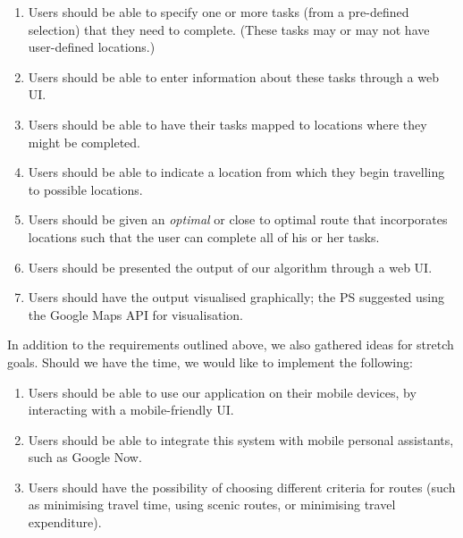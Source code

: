 \documentclass[10pt]{article}
\begin{document}
\begin{enumerate}
\item Users should be able to specify one or more tasks (from a pre-defined selection) that they need to complete. (These tasks may or may not have user-defined locations.)
\item Users should be able to enter information about these tasks through a web UI.
\item Users should be able to have their tasks mapped to locations where they might be completed.
\item Users should be able to indicate a location from which they begin travelling to possible locations.
\item Users should be given an \textit{optimal} or close to optimal route that incorporates locations such that the user can complete all of his or her tasks. 
\item Users should be presented the output of our algorithm through a web UI.
\item Users should have the output visualised graphically; the PS suggested using the Google Maps API for visualisation.
\end{enumerate}
In addition to the requirements outlined above, we also gathered ideas for stretch goals. Should we have the time, we would like to implement the following:
\begin{enumerate}
\item Users should be able to use our application on their mobile devices, by interacting with a mobile-friendly UI.
\item Users should be able to integrate this system with mobile personal assistants, such as Google Now.
\item Users should have the possibility of choosing different criteria for routes (such as minimising travel time, using scenic routes, or minimising travel expenditure).
\end{enumerate}
\end{document}
